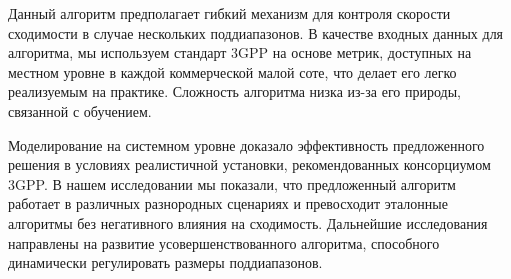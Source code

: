 Данный алгоритм предполагает гибкий механизм для контроля скорости сходимости в случае нескольких поддиапазонов. В качестве входных данных для алгоритма, мы используем стандарт 3GPP на основе метрик, доступных на местном уровне в каждой коммерческой малой соте, что делает его легко реализуемым на практике. Сложность алгоритма низка из-за его природы, связанной с обучением.

Моделирование на системном уровне доказало эффективность предложенного решения в условиях реалистичной установки, рекомендованных консорциумом 3GPP. В нашем исследовании мы показали, что предложенный алгоритм работает в различных разнородных сценариях и превосходит эталонные алгоритмы без негативного влияния на сходимость. Дальнейшие исследования направлены на развитие усовершенствованного алгоритма, способного динамически регулировать размеры поддиапазонов.
